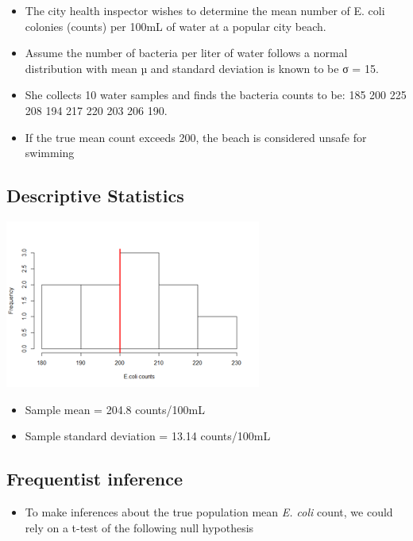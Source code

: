 \documentclass[
]{book}
\providecommand{\tightlist}{%
  \setlength{\itemsep}{0pt}\setlength{\parskip}{0pt}}
\begin{document}
\begin{itemize}
\tightlist
\item
  The city health inspector wishes to determine the mean number of E. coli colonies (counts) per 100mL of water at a popular city beach.
\item
  Assume the number of bacteria per liter of water follows a normal distribution with mean µ and standard deviation is known to be σ = 15.
\item
  She collects 10 water samples and finds the bacteria counts to be: 185 200 225 208 194 217 220 203 206 190.
\item
  If the true mean count exceeds 200, the beach is considered unsafe for swimming
\end{itemize}

\hypertarget{descriptive-statistics}{%
\subsection{Descriptive Statistics}\label{descriptive-statistics}}

\includegraphics[width=0.5\linewidth]{./6_4}

\begin{itemize}
\tightlist
\item
  Sample mean = 204.8 counts/100mL
\item
  Sample standard deviation = 13.14 counts/100mL
\end{itemize}

\hypertarget{frequentist-inference}{%
\subsection{Frequentist inference}\label{frequentist-inference}}

\begin{itemize}
\tightlist
\item
  To make inferences about the true population mean \emph{E. coli} count, we could rely on a t-test of the following null hypothesis
\end{itemize}
\end{document}
